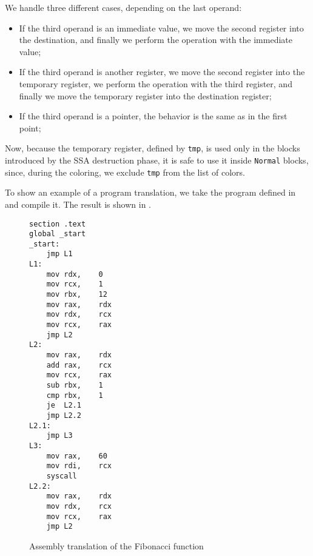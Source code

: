 We handle three different cases, depending on the last operand:
\begin{itemize}
  \item If the third operand is an immediate value, we move the second register into the destination, and finally we perform the operation with the immediate value;
  \item If the third operand is another register, we move the second register into the temporary register, we perform the operation with the third register, and finally we move the temporary register into the destination register;
  \item If the third operand is a pointer, the behavior is the same as in the first point;
\end{itemize}
Now, because the temporary register, defined by \texttt{tmp}, is used only in the blocks introduced by the SSA destruction phase, it is safe to use it inside \texttt{Normal} blocks, since, during the coloring, we exclude \texttt{tmp} from the list of colors.

To show an example of a program translation, we take the program defined in  and compile it. The result is shown in .

\begin{figure}[ht]
\begin{lstlisting}[style=NASM]
section .text
global _start
_start:
	jmp	L1
L1:
	mov	rdx,	0
	mov	rcx,	1
	mov	rbx,	12
	mov	rax,	rdx
	mov	rdx,	rcx
	mov	rcx,	rax
	jmp	L2
L2:
	mov	rax,	rdx
	add	rax,	rcx
	mov	rcx,	rax
	sub	rbx,	1
	cmp	rbx,	1
	je	L2.1
	jmp	L2.2
L2.1:
	jmp	L3
L3:
	mov	rax,	60
	mov	rdi,	rcx
	syscall
L2.2:
	mov	rax,	rdx
	mov	rdx,	rcx
	mov	rcx,	rax
	jmp	L2
\end{lstlisting}
\caption{Assembly translation of the Fibonacci function}
\label{fig:example-nasm}
\end{figure}